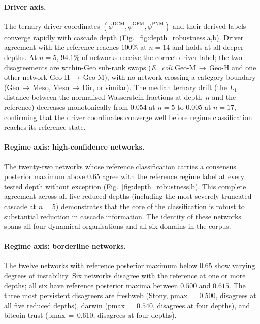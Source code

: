 \documentclass[aps,superscriptaddress,11pt]{revtex4-2}
\theoremstyle{definition}
\theoremstyle{plain}
\begin{document}
\paragraph{Driver axis.}
The ternary driver coordinates $(\phi^{\mathrm{DCM}}, \phi^{\mathrm{GFM}},
\phi^{\mathrm{PNM}})$ and their derived labels converge rapidly with
cascade depth (Fig.~\ref{fig:depth_robustness}a,b).  Driver agreement
with the reference reaches $100\%$ at $n = 14$ and holds at all deeper
depths.  At $n = 5$, $94.1\%$ of networks receive the correct driver
label; the two disagreements are within-Geo sub-rank swaps
(\textit{E.~coli} Geo-M\,$\to$\,Geo-H and one other network Geo-H\,$\to$\,Geo-M),
with no network crossing a category boundary (Geo\,$\to$\,Meso, Meso\,$\to$\,Dir,
or similar).  The median ternary drift (the $L_1$ distance between the
normalised Wasserstein fractions at depth~$n$ and the reference)
decreases monotonically from $0.054$ at $n = 5$ to $0.005$ at $n = 17$,
confirming that the driver coordinates converge well before regime
classification reaches its reference state.

\paragraph{Regime axis: high-confidence networks.}
The twenty-two networks whose reference classification carries a consensus
posterior maximum above $0.65$ agree with the reference regime label at
every tested depth without exception (Fig.~\ref{fig:depth_robustness}b).
This complete agreement across all five reduced depths (including the
most severely truncated cascade at $n = 5$) demonstrates that the
core of the classification is robust to substantial reduction in cascade
information.  The identity of these networks spans all four dynamical
organisations and all six domains in the corpus.

\paragraph{Regime axis: borderline networks.}
The twelve networks with reference posterior maximum below $0.65$ show
varying degrees of instability.  Six networks disagree with the reference
at one or more depths; all six have reference posterior maxima between
$0.500$ and $0.615$.  The three most persistent disagreers are freshweb
(Stony, pmax\,$=\,0.500$, disagrees at all five reduced depths), darwin
(pmax\,$=\,0.540$, disagrees at four depths), and bitcoin trust
(pmax\,$=\,0.610$, disagrees at four depths).
\end{document}
